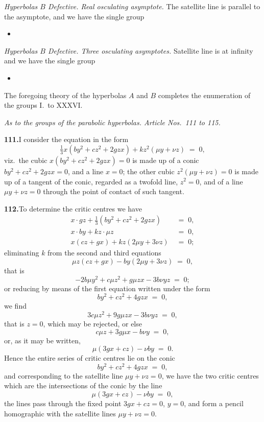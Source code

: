 \documentclass[11pt]{article}
\begin{document}
\noindent\emph{Hyperbolas $B$ Defective. Real osculating asymptote.} The satellite line is parallel to the asymptote, and we have the single group
\begin{itemize}\itemsep0pt
\item[XXXIV.]
\end{itemize}

\noindent\emph{Hyperbolas $B$ Defective. Three osculating asymptotes.} Satellite line is at infinity and we have the single group
\begin{itemize}\itemsep0pt
\item[XXXVI.]
\end{itemize}

The foregoing theory of the hyperbolas $A$ and $B$ completes the enumeration of the groups I.\ to XXXVI.

\bigskip
\noindent\textit{As to the groups of the parabolic hyperbolas. Article Nos.~111 to 115.}

\medskip
\textbf{111.}\quad I consider the equation in the form
\[
\tfrac{1}{3} x(b y^{2} + c z^{2} + 2 g z x) + k z^{2}(\mu y + \nu z) \;=\; 0,
\]
viz.\ the cubic $x(b y^{2} + c z^{2} + 2 g z x) = 0$ is made up of a conic $b y^{2} + c z^{2} + 2 g z x = 0$, and a line $x = 0$; the other cubic $z^{2}(\mu y + \nu z) = 0$ is made up of a tangent of the conic, regarded as a twofold line, $z^{2} = 0$, and of a line $\mu y + \nu z = 0$ through the point of contact of such tangent.

\medskip
\textbf{112.}\quad To determine the critic centres we have
\begin{align*}
x \cdot g z + \tfrac{1}{3}(b y^{2} + c z^{2} + 2 g z x) &\;=\; 0,\\
x \cdot b y + k z \cdot \mu z &\;=\; 0,\\
x(c z + g x) + k z(2 \mu y + 3 \nu z) &\;=\; 0;
\end{align*}
eliminating $k$ from the second and third equations
\[
\mu z(c z + g x) - b y(2 \mu y + 3 \nu z) \;=\; 0,
\]
that is
\[
-2 b \mu y^{2} + c \mu z^{2} + g \mu z x - 3 b \nu y z \;=\; 0;
\]
or reducing by means of the first equation written under the form
\[
b y^{2} + c z^{2} + 4 g z x \;=\; 0,
\]
we find
\[
3 c \mu z^{2} + 9 g \mu z x - 3 b \nu y z \;=\; 0,
\]
that is $z = 0$, which may be rejected, or else
\[
c \mu z + 3 g \mu x - b \nu y \;=\; 0,
\]
or, as it may be written,
\[
\mu(3 g x + c z) - \nu b y \;=\; 0.
\]
Hence the entire series of critic centres lie on the conic
\[
b y^{2} + c z^{2} + 4 g z x \;=\; 0,
\]
and corresponding to the satellite line $\mu y + \nu z = 0$, we have the two critic centres which are the intersections of the conic by the line
\[
\mu(3 g x + c z) - \nu b y \;=\; 0,
\]
the lines pass through the fixed point $3 g x + c z = 0$, $y = 0$, and form a pencil homographic with the satellite lines $\mu y + \nu z = 0$.
\end{document}
